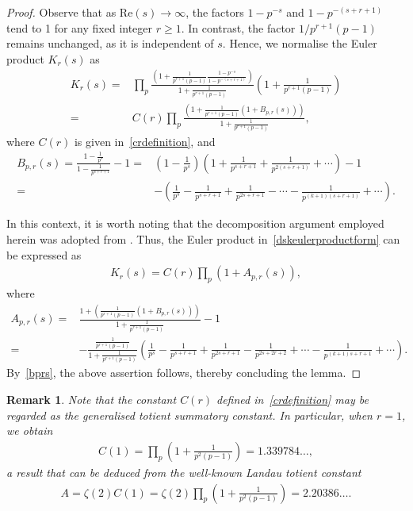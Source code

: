 \documentclass[12pt, oneside,reqno]{amsart}
\numberwithin{equation}{section}
\newtheorem{remark}[theorem]{Remark}
\begin{document}
\begin{proof}
\noindent
Observe that as $\mathrm{Re}(s)\to\infty$, the factors $1-p^{-s}$ and $1-p^{-(s+r+1)}$ tend to 1 for any fixed integer $r\geq 1$. In contrast, the factor 
${1}/{p^{r+1}(p-1)}$ remains unchanged, as it is independent of $s$. Hence, we normalise the Euler product $K_r(s)$ as
\begin{align*}
K_r(s)
=&\prod_p\frac{\left(1+\frac{1}{p^{r+1}(p-1)}\frac{1-p^{-{s}}}{1-p^{-(s+r+1)}}\right)}{1+\frac{1}{p^{r+1}(p-1)}}\left(1+\frac{1}{p^{r+1}(p-1)}\right)\\
=&{C(r)}\prod_{p}\frac{\left(1+\frac{1}{p^{r+1}(p-1)}(1+B_{p,r}(s))\right)}{1+\frac{1}{p^{r+1}(p-1)}},
\end{align*}
where $C(r)$ is given in~\eqref{crdefinition}, and
\begin{align}\label{bprs}
B_{p,r}(s)
=\frac{1-\frac{1}{p^s}}{1-\frac{1}{p^{s+r+1}}}-1
=&\left(1-\frac{1}{p^s}\right)\left(1+\frac{1}{p^{s+r+1}}+\frac{1}{p^{2(s+r+1)}}+\cdots\right)-1\nonumber\\
=&-\left(\frac{1}{p^s}-\frac{1}{p^{s+r+1}}+\frac{1}{p^{2s+r+1}}-\cdots-\frac{1}{p^{(k+1)(s+r+1)}}+\cdots\right).
\end{align}

\noindent
In this context, it is worth noting that the decomposition argument employed herein was adopted from \cite[\S3]{alexandru}. Thus, the Euler product in~\eqref{dskeulerproductform} can be expressed as
\begin{align*}
K_r(s)=C(r)\prod_{p}(1+A_{p,r}(s)) ,   
\end{align*}
where
\begin{align*}
A_{p,r}(s)
=&\frac{1+\left(\frac{1}{p^{r+1}(p-1)}\left(1+B_{p,r}(s)\right)\right)}{1+\frac{1}{p^{r+1}(p-1)}}-1\\
=&-\frac{\frac{1}{p^{r+1}(p-1)}}{1+\frac{1}{p^{r+1}(p-1)}}\left(\frac{1}{p^s}-\frac{1}{p^{s+r+1}}+\frac{1}{p^{2s+r+1}}-\frac{1}{p^{2s+2r+2}}+\cdots-\frac{1}{p^{(k+1)s+r+1}}+\cdots\right).
\end{align*}
By~\eqref{bprs}, the above assertion follows, thereby concluding the lemma.
\end{proof}

\begin{remark}
Note that the constant $C(r)$ defined in~\eqref{crdefinition} may be regarded as the generalised totient summatory constant. In particular, when $r=1$, we obtain
\begin{align*}
C(1)=\prod_{p}\left(1+\frac{1}{p^2(p-1)}\right)=1.339784\ldots,   
\end{align*}
a result that can be deduced from the well-known Landau totient constant
\begin{align*}
A
=\zeta(2)C(1)
=\zeta(2)\prod_{p}\left(1+\frac{1}{p^2(p-1)}\right)
=2.20386\ldots.  
\end{align*}
\end{remark}
\end{document}
